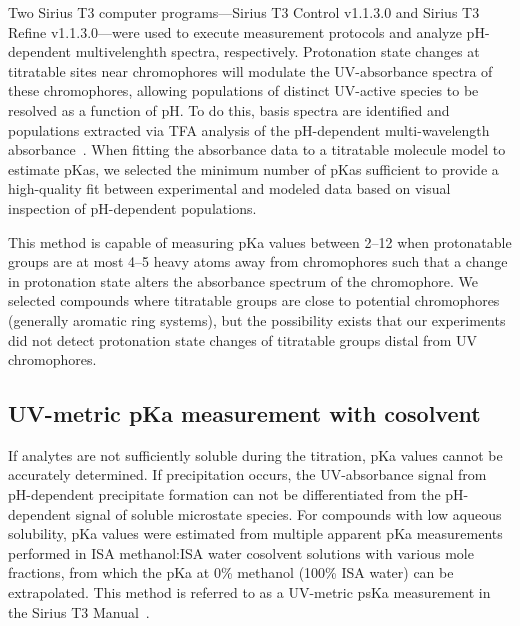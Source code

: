 \documentclass[9pt,lineno]{elife}
\begin{document}
Two Sirius T3 computer programs---Sirius T3 Control v1.1.3.0 and Sirius T3 Refine v1.1.3.0---were used to execute measurement protocols and analyze pH-dependent multivelenghth spectra, respectively.
Protonation state changes at titratable sites near chromophores will modulate the UV-absorbance spectra of these chromophores, allowing populations of distinct UV-active species to be resolved as a function of pH. 
To do this, basis spectra are identified and populations extracted via TFA analysis of the pH-dependent multi-wavelength absorbance~\citep{allen_multiwavelength_1998}. 
When fitting the absorbance data to a titratable molecule model to estimate pKas, we selected the minimum number of pKas sufficient to provide a high-quality fit between experimental and modeled data based on visual inspection of pH-dependent populations.

This method is capable of measuring pKa values between 2--12 when protonatable groups are at most 4--5 heavy atoms away from chromophores such that a change in protonation state alters the absorbance spectrum of the chromophore. 
We selected compounds where titratable groups are close to potential chromophores (generally aromatic ring systems), but the possibility exists that our experiments did not detect protonation state changes of titratable groups distal from UV chromophores.

\subsection{UV-metric pKa measurement with cosolvent}

If analytes are not sufficiently soluble during the titration, pKa values cannot be accurately determined. 
If precipitation occurs, the UV-absorbance signal from pH-dependent precipitate formation can not be differentiated from the pH-dependent signal of soluble microstate species. 
For compounds with low aqueous solubility, pKa values were estimated from multiple apparent pKa measurements performed in ISA methanol:ISA water cosolvent solutions with various mole fractions, from which the pKa at 0\% methanol (100\% ISA water) can be extrapolated. 
This method is referred to as a UV-metric psKa measurement in the Sirius T3 Manual~\citep{noauthor_sirius_2008}.
\end{document}
